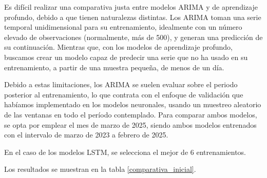 Es difícil realizar una comparativa justa entre modelos ARIMA y de aprendizaje profundo, debido a que tienen naturalezas distintas.
Los ARIMA toman una serie temporal unidimensional para su entrenamiento, idealmente con un número elevado de observaciones (normalmente, más de 500),
 y generan una predicción de su continuación. Mientras que, con los modelos de aprendizaje profundo, buscamos crear un modelo capaz de predecir
una serie que no ha usado en su entrenamiento, a partir de una muestra pequeña, de menos de un día.  


Debido a estas limitaciones, los ARIMA se suelen evaluar sobre el periodo posterior al entrenamiento, lo que contrata con el enfoque de validación que habíamos implementado 
en los modelos neuronales, usando un muestreo aleatorio de las ventanas en todo el período contemplado.
Para comparar ambos modelos, se opta por emplear el mes de marzo de 2025, siendo ambos modelos entrenados con el intervalo de marzo de 2023 a febrero de 2025.  

En el caso de los modelos LSTM, se selecciona el mejor de 6 entrenamientos. 

Los resultados se muestran en la tabla \ref{comparativa_inicial}.

